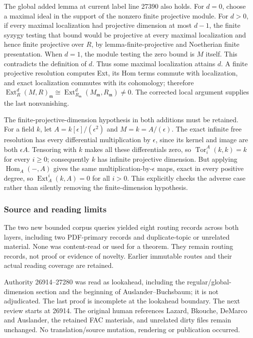 The global added lemma at current label line 27390 also holds. For \(d=0\), choose a maximal ideal in the support of the nonzero finite projective module. For \(d>0\), if every maximal localization had projective dimension at most \(d-1\), the finite syzygy testing that bound would be projective at every maximal localization and hence finite projective over \(R\), by lemma-finite-projective and Noetherian finite presentation. When \(d=1\), the module testing the zero bound is \(M\) itself. This contradicts the definition of \(d\). Thus some maximal localization attains \(d\). A finite projective resolution computes Ext, its Hom terms commute with localization, and exact localization commutes with its cohomology; therefore \(\operatorname{Ext}^d_R(M,R)_{\mathfrak m}
\cong\operatorname{Ext}^d_{R_{\mathfrak m}}(M_{\mathfrak m},R_{\mathfrak m})\ne0\). The corrected local argument supplies the last nonvanishing.

The finite-projective-dimension hypothesis in both additions must be retained. For a field \(k\), let \(A=k[\epsilon]/(\epsilon^2)\) and \(M=k=A/(\epsilon)\). The exact infinite free resolution has every differential multiplication by \(\epsilon\), since its kernel and image are both \(\epsilon A\). Tensoring with \(k\) makes all these differentials zero, so \(\operatorname{Tor}^A_i(k,k)=k\) for every \(i\ge0\); consequently \(k\) has infinite projective dimension. But applying \(\operatorname{Hom}_A(-,A)\) gives the same multiplication-by-\(\epsilon\) maps, exact in every positive degree, so \(\operatorname{Ext}_A^i(k,A)=0\) for all \(i>0\). This explicitly checks the adverse case rather than silently removing the finite-dimension hypothesis.

\subsubsection{Source and reading limits}\label{algebra-proof-022-source-and-reading-limits}

The two new bounded corpus queries yielded eight routing records across both layers, including two PDF-primary records and duplicate-topic or unrelated material. None was content-read or used for a theorem. They remain routing records, not proof or evidence of novelty. Earlier immutable routes and their actual reading coverage are retained.

Authority 26914--27280 was read as lookahead, including the regular/global-dimension section and the beginning of Auslander--Buchsbaum; it is not adjudicated. The last proof is incomplete at the lookahead boundary. The next review starts at 26914. The original human references Lazard, Bkouche, DeMarco and Auslander, the retained FAC materials, and unrelated dirty files remain unchanged. No translation/source mutation, rendering or publication occurred.
